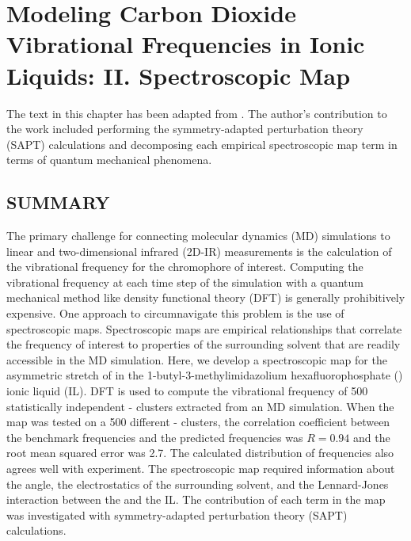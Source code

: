\documentclass[%
  class = book,%
  crop = false,%
  float = true,%
  multi = true,%
  preview = false,%
]{standalone}
\newcommand{\caps}[1]{\uppercase{#1}}
\begin{document}
\chapter[\texorpdfstring{\ce{CO2}}{CO2}-IL Spectroscopic Map Development]{Modeling Carbon Dioxide Vibrational Frequencies in Ionic Liquids: II. Spectroscopic Map}
\label{ch:paper_03}

The text in this chapter has been adapted from . The author's contribution to the work included performing the symmetry-adapted perturbation theory (SAPT) calculations and decomposing each empirical spectroscopic map term in terms of quantum mechanical phenomena.

\section{\texorpdfstring{\caps{Summary}}{Summary}}

The primary challenge for connecting molecular dynamics (MD) simulations to linear and two-dimensional infrared (2D-IR) measurements is the calculation of the vibrational frequency for the chromophore of interest. Computing the vibrational frequency at each time step of the simulation with a quantum mechanical method like density functional theory (DFT) is generally prohibitively expensive. One approach to circumnavigate this problem is the use of spectroscopic maps. Spectroscopic maps are empirical relationships that correlate the frequency of interest to properties of the surrounding solvent that are readily accessible in the MD simulation. Here, we develop a spectroscopic map for the asymmetric stretch of  in the 1-butyl-3-methylimidazolium hexafluorophosphate (\ce{[C4C1im][PF6]}) ionic liquid (IL). DFT is used to compute the vibrational frequency of \num{500} statistically independent -\ce{[C4C1im][PF6]} clusters extracted from an MD simulation. When the map was tested on a \num{500} different -\ce{[C4C1im][PF6]} clusters, the correlation coefficient between the benchmark frequencies and the predicted frequencies was \(R = 0.94\) and the root mean squared error was \SI{2.7}{\wavenumber}. The calculated distribution of frequencies also agrees well with experiment. The spectroscopic map required information about the  angle, the electrostatics of the surrounding solvent, and the Lennard-Jones interaction between the  and the IL. The contribution of each term in the map was investigated with symmetry-adapted perturbation theory (SAPT) calculations.
\end{document}
